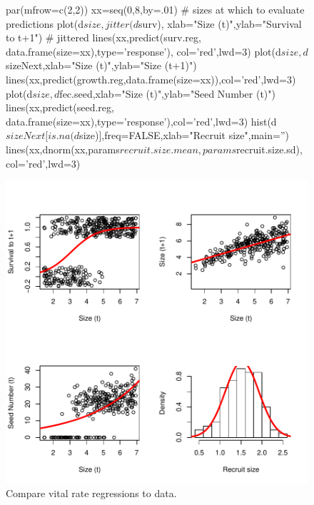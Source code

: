 \documentclass[11pt]{article}
\begin{document}
\begin{figure}[H]
\begin{center}
\begin{Schunk}
\begin{Sinput}
     par(mfrow=c(2,2))
     xx=seq(0,8,by=.01) # sizes at which to evaluate predictions
     plot(d$size,jitter(d$surv), xlab="Size (t)",ylab="Survival to t+1") # jittered 
     lines(xx,predict(surv.reg,
        data.frame(size=xx),type='response'), col='red',lwd=3)
     plot(d$size,d$sizeNext,xlab="Size (t)",ylab="Size (t+1)")  
     lines(xx,predict(growth.reg,data.frame(size=xx)),col='red',lwd=3)
     plot(d$size,d$fec.seed,xlab="Size (t)",ylab="Seed Number (t)")
     lines(xx,predict(seed.reg,
        data.frame(size=xx),type='response'),col='red',lwd=3)
     hist(d$sizeNext[is.na(d$size)],freq=FALSE,xlab="Recruit size",main='')
     lines(xx,dnorm(xx,params$recruit.size.mean,
        params$recruit.size.sd), col='red',lwd=3)
\end{Sinput}
\end{Schunk}
\includegraphics{IPM_Guide_Appendix_A-fig2}
\caption{Compare vital rate regressions to data.}
\label{fig:figA2}
\end{center}
\end{figure}

\end{document}
